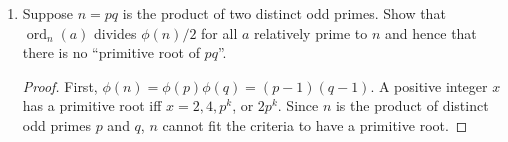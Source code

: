 \documentclass[11pt]{article}
\theoremstyle{definition}
\newcommand{\ord}{\operatorname{ord}}
\begin{document}
\begin{enumerate}
\begin{enumerate}
        \item $n$ is a primitive root of $43$.
        \begin{proof}
            Given $3$ is a primitive root, $\ord_{43}(3) = \phi(43) = 42$. Also, 
            \[ 
                \ord_{43}(3^h) = \frac{42}{\gcd(h,42)}
            \]
            $3^h$ is a primitive root $\pmod{43}$ if $\ord_{43}(3^h) = 42$. So, find 
            all values of $h$ such that $\gcd(h,42)=1$. 
            \[ h = 1,5,11,13,17,19,23,25,29,31,37,41 \]
            Now find $3^h\pmod{43}$ for all values of $h$.
            \begin{align*}
                3^1\pmod{43} &= 3 \\
                3^5\pmod{43} &= 28 \\
                3^{11}\pmod{43} &= 30 \\
                3^{13}\pmod{43} &= 12 \\
                3^{17}\pmod{43} &= 26 \\
                3^{19}\pmod{43} &= 19 \\
                3^{23}\pmod{43} &= 34 \\
                3^{25}\pmod{43} &= 5 \\
                3^{29}\pmod{43} &= 18 \\
                3^{31}\pmod{43} &= 33 \\
                3^{37}\pmod{43} &= 20 \\
                3^{41}\pmod{43} &= 29
            \end{align*}
            So, the primitive roots of $43$ are $3,5,12,18,19,20,26,28,29,30,34,33$.
        \end{proof}

    \end{enumerate}

    \item Suppose $n = pq$ is the product of two distinct odd primes. Show that $\ord_n(a)$ divides $\phi(n)/2$ for all $a$ relatively prime to $n$ and hence that there is no ``primitive root of $pq$''.
    \begin{proof}
        First, $ \phi(n) = \phi(p)\phi(q) = (p-1)(q-1) $.
        A positive integer $x$ has a primitive root iff $x = 2,4,p^k$, or $2p^k$. 
        Since $n$ is the product of distinct odd primes $p$ and $q$, $n$ cannot fit the 
        criteria to have a primitive root.

    \end{proof}

\end{enumerate}
\end{document}
